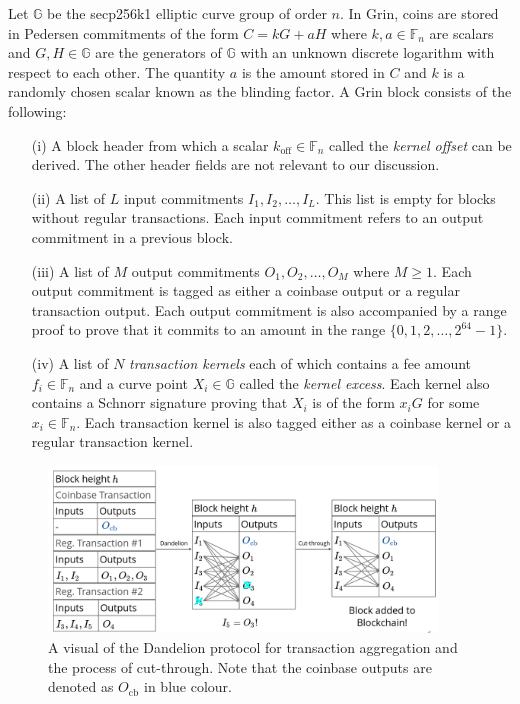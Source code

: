 Let $\mathbb{G}$ be the secp256k1 elliptic curve group of order $n$.
In Grin, coins are stored in Pedersen commitments of the form $C = kG + aH$ where $k, a \in \mathbb{F}_n$ are scalars and $G, H \in \mathbb{G}$ are the generators of $\mathbb{G}$ with an unknown discrete logarithm with respect to each other.
The quantity $a$ is the amount stored in $C$ and $k$ is a randomly chosen scalar known as the blinding factor. 
A Grin block consists of the following:
\begin{enumerate}
  \item[(i)] A block header from which a scalar $k_{\text{off}} \in \mathbb{F}_n$ called the \textit{kernel offset} can be derived. The other header fields are not relevant to our discussion.
  \item[(ii)] A list of $L$ input commitments $I_1, I_2,\ldots,I_L$. This list is empty for blocks without regular transactions. Each input commitment refers to an output commitment in a previous block.
  \item[(iii)] A list of $M$ output commitments $O_1, O_2,\ldots,O_M$ where $M \ge 1$. Each output commitment is tagged as either a coinbase output or a regular transaction output. Each output commitment is also accompanied by a range proof to prove that it commits to an amount in the range $\{0,1,2, \dots,2^{64}-1\}$.  
  \item[(iv)] A list of $N$ \textit{transaction kernels} each of which contains a fee amount $f_i \in \mathbb{F}_n$ and a curve point $X_i \in \mathbb{G}$ called the \textit{kernel excess}. Each kernel also contains a Schnorr signature proving that $X_i$ is of the form $x_iG$ for some $x_i \in \mathbb{F}_n$. Each transaction kernel is also tagged either as a coinbase kernel or a regular transaction kernel.
\end{enumerate}

\begin{figure}[t]
  \includegraphics[width=0.92\textwidth]{Figures/block1.png}
  \centering
  \caption{A visual of the Dandelion protocol for transaction aggregation and the process of cut-through.
  Note that the coinbase outputs are denoted as $O_{\text{cb}}$ in blue colour.}
  \label{fig:dandelion}
\end{figure}

